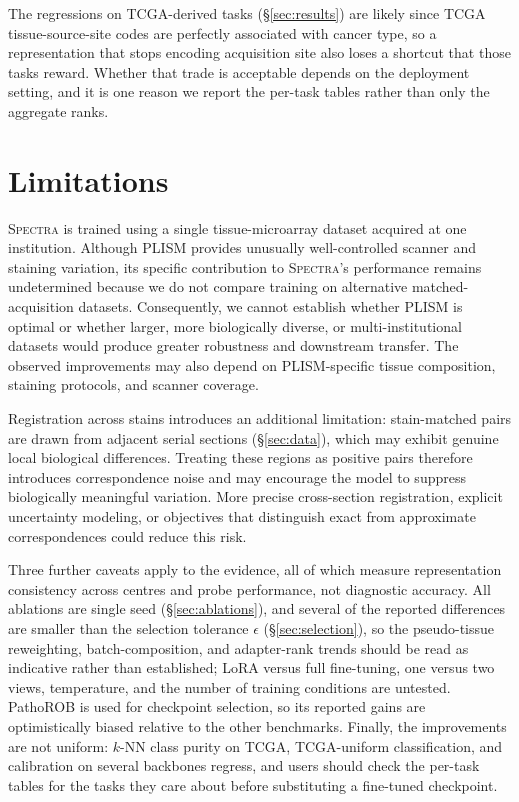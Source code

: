\documentclass{article}
\begin{document}
The regressions on TCGA-derived tasks (\S\ref{sec:results}) are likely since TCGA tissue-source-site codes are perfectly associated with cancer type, so a representation that stops encoding acquisition site also loses a shortcut that those tasks reward. Whether that trade is acceptable depends on the deployment setting, and it is one reason we report the per-task tables rather than only the aggregate ranks.

\section{Limitations}

\textsc{Spectra} is trained using a single tissue-microarray dataset acquired at one institution. Although PLISM provides unusually well-controlled scanner and staining variation, its specific contribution to \textsc{Spectra}'s performance remains undetermined because we do not compare training on alternative matched-acquisition datasets. Consequently, we cannot establish whether PLISM is optimal or whether larger, more biologically diverse, or multi-institutional datasets would produce greater robustness and downstream transfer. The observed improvements may also depend on PLISM-specific tissue composition, staining protocols, and scanner coverage.

Registration across stains introduces an additional limitation: stain-matched pairs are drawn from adjacent serial sections (\S\ref{sec:data}), which may exhibit genuine local biological differences. Treating these regions as positive pairs therefore introduces correspondence noise and may encourage the model to suppress biologically meaningful variation. More precise cross-section registration, explicit uncertainty modeling, or objectives that distinguish exact from approximate correspondences could reduce this risk.

Three further caveats apply to the evidence, all of which measure representation consistency across centres and probe performance, not diagnostic accuracy. All ablations are single seed (\S\ref{sec:ablations}), and several of the reported differences are smaller than the selection tolerance $\epsilon$ (\S\ref{sec:selection}), so the pseudo-tissue reweighting, batch-composition, and adapter-rank trends should be read as indicative rather than established; LoRA versus full fine-tuning, one versus two views, temperature, and the number of training conditions are untested. PathoROB is used for checkpoint selection, so its reported gains are optimistically biased relative to the other benchmarks. Finally, the improvements are not uniform: $k$-NN class purity on TCGA, TCGA-uniform classification, and calibration on several backbones regress, and users should check the per-task tables for the tasks they care about before substituting a fine-tuned checkpoint.
\end{document}
